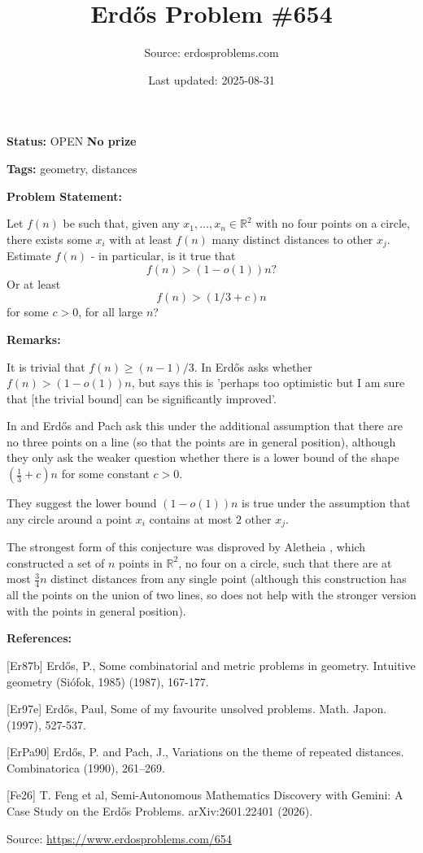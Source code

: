 \documentclass{article}
\title{Erd\H{o}s Problem \#654}
\date{Last updated: 2025-08-31}
\author{Source: erdosproblems.com}
\begin{document}
\maketitle

\noindent\textbf{Status:} OPEN \quad \textbf{No prize}

\noindent\textbf{Tags:} geometry, distances

\medskip
\noindent\textbf{Problem Statement:}

Let $f(n)$ be such that, given any $x_1,\ldots,x_n\in \mathbb{R}^2$ with no four points on a circle, there exists some $x_i$ with at least $f(n)$ many distinct distances to other $x_j$. Estimate $f(n)$ - in particular, is it true that\[f(n)>(1-o(1))n?\]Or at least\[f(n) > (1/3+c)n\]for some $c>0$, for all large $n$?

\bigskip
\noindent\textbf{Remarks:}

It is trivial that $f(n) \geq (n-1)/3$. In \cite{Er97e} Erd\H{o}s asks whether $f(n)>(1-o(1))n$, but says this is 'perhaps too optimistic but I am sure that [the trivial bound] can be significantly improved'.

In \cite{Er87b} and \cite{ErPa90} Erd\H{o}s and Pach ask this under the additional assumption that there are no three points on a line (so that the points are in general position), although they only ask the weaker question whether there is a lower bound of the shape $(\tfrac{1}{3}+c)n$ for some constant $c>0$.

They suggest the lower bound $(1-o(1))n$ is true under the assumption that any circle around a point $x_i$ contains at most $2$ other $x_j$.

The strongest form of this conjecture was disproved by Aletheia \cite{Fe26}, which constructed a set of $n$ points in $\mathbb{R}^2$, no four on a circle, such that there are at most $\frac{3}{4}n$ distinct distances from any single point (although this construction has all the points on the union of two lines, so does not help with the stronger version with the points in general position).

\bigskip
\noindent\textbf{References:}

[Er87b] Erd\H{o}s, P., Some combinatorial and metric problems in geometry. Intuitive geometry (Si\'{o}fok, 1985) (1987), 167-177.
 
 [Er97e] Erd\H{o}s, Paul, Some of my favourite unsolved problems. Math. Japon. (1997), 527-537.
 
 [ErPa90] Erd\H{o}s, P. and Pach, J., Variations on the theme of repeated distances. Combinatorica (1990), 261--269.
 
 [Fe26] T. Feng et al, Semi-Autonomous Mathematics Discovery with Gemini: A Case Study on the Erd\H{o}s Problems. arXiv:2601.22401 (2026).

\bigskip
\noindent\small{Source: \url{https://www.erdosproblems.com/654}}
\end{document}
